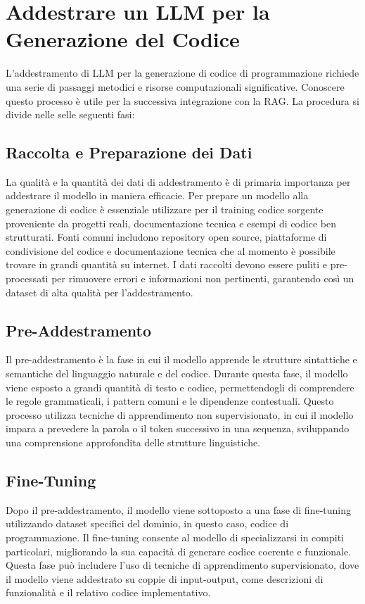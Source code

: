 \documentclass[12pt,a4paper,openright,twoside]{book}
\begin{document}
\chapter{Addestrare un LLM per la Generazione del Codice}

L'addestramento di LLM per la generazione di codice di programmazione richiede una serie di passaggi metodici e risorse computazionali significative.
Conoscere questo processo è utile per la successiva integrazione con la RAG.
La procedura si divide nelle selle seguenti fasi:

\section{Raccolta e Preparazione dei Dati}

La qualità e la quantità dei dati di addestramento è di primaria importanza per addestrare il modello in maniera efficacie.
Per prepare un modello alla generazione di codice è essenziale utilizzare per il training codice sorgente proveniente da progetti reali, documentazione tecnica e esempi di codice ben strutturati.
Fonti comuni includono repository open source, piattaforme di condivisione del codice e documentazione tecnica che al momento è possibile trovare in grandi quantità su internet.
I dati raccolti devono essere puliti e pre-processati per rimuovere errori e informazioni non pertinenti, garantendo così un dataset di alta qualità per l'addestramento.

\section{Pre-Addestramento}
Il pre-addestramento è la fase in cui il modello apprende le strutture sintattiche e semantiche del linguaggio naturale e del codice. Durante questa fase, il modello viene esposto a grandi quantità di testo e codice, permettendogli di comprendere le regole grammaticali, i pattern comuni e le dipendenze contestuali. Questo processo utilizza tecniche di apprendimento non supervisionato, in cui il modello impara a prevedere la parola o il token successivo in una sequenza, sviluppando una comprensione approfondita delle strutture linguistiche.

\section{Fine-Tuning}
Dopo il pre-addestramento, il modello viene sottoposto a una fase di fine-tuning utilizzando dataset specifici del dominio, in questo caso, codice di programmazione. Il fine-tuning consente al modello di specializzarsi in compiti particolari, migliorando la sua capacità di generare codice coerente e funzionale. Questa fase può includere l'uso di tecniche di apprendimento supervisionato, dove il modello viene addestrato su coppie di input-output, come descrizioni di funzionalità e il relativo codice implementativo.
\end{document}
